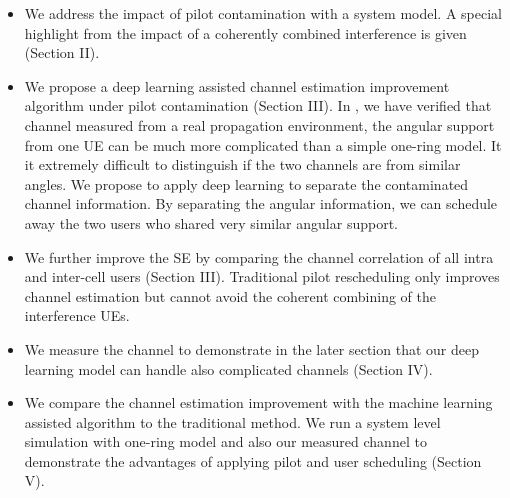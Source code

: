 \begin{itemize}

\item We address the impact of pilot contamination with a system model. A special highlight from the impact of a coherently combined interference is given (Section II). 

\item We propose a deep learning assisted channel estimation improvement algorithm under pilot contamination (Section III). In \cite{Chen2018pilot}, we have verified that channel measured from a real propagation environment, the angular support from one UE can be much more complicated than a simple one-ring model. It it extremely difficult to distinguish if the two channels are from similar angles. %
We propose to apply deep learning to separate the contaminated channel information. By separating the angular information, we can schedule away the two users who shared very similar angular support.

\item We further improve the SE by comparing the channel correlation of all intra and inter-cell users (Section III). Traditional pilot rescheduling only improves channel estimation but cannot avoid the coherent combining of the interference UEs.
\item We measure the channel to demonstrate in the later section that our deep learning model can handle also complicated channels (Section IV). 
\item We compare the channel estimation improvement with the machine learning assisted algorithm to the traditional method. We run a system level simulation with one-ring model and also our measured channel to demonstrate the advantages of applying pilot and user scheduling (Section V).
\end{itemize}
